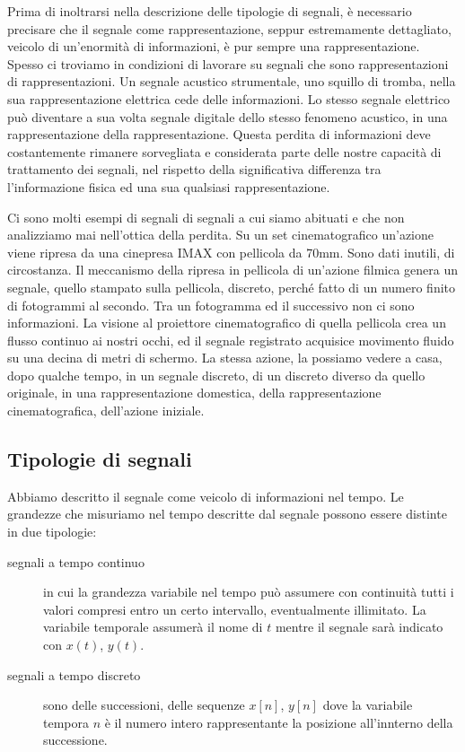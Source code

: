Prima di inoltrarsi nella descrizione delle tipologie di segnali, è necessario
precisare che il segnale come rappresentazione, seppur estremamente dettagliato,
veicolo di un'enormità di informazioni, è pur sempre una rappresentazione. Spesso
ci troviamo in condizioni di lavorare su segnali che sono rappresentazioni di
rappresentazioni. Un segnale acustico strumentale, uno squillo di tromba,
nella sua rappresentazione elettrica cede delle informazioni. Lo stesso segnale
elettrico può diventare a sua volta segnale digitale dello stesso fenomeno acustico,
in una rappresentazione della rappresentazione. Questa perdita di informazioni
deve costantemente rimanere sorvegliata e considerata parte delle nostre capacità
di trattamento dei segnali, nel rispetto della significativa differenza tra
l'informazione fisica ed una sua qualsiasi rappresentazione.

Ci sono molti esempi di segnali di segnali a cui siamo abituati e che non analizziamo
mai nell'ottica della perdita. Su un set cinematografico un'azione viene ripresa
da una cinepresa IMAX con pellicola da 70mm. Sono dati inutili, di circostanza.
Il meccanismo della ripresa in pellicola di un'azione filmica genera un segnale,
quello stampato sulla pellicola, discreto, perché fatto di un numero finito di
fotogrammi al secondo. Tra un fotogramma ed il successivo non ci sono informazioni.
La visione al proiettore cinematografico di quella pellicola crea un flusso
continuo ai nostri occhi, ed il segnale registrato acquisice movimento fluido su
una decina di metri di schermo. La stessa azione, la possiamo vedere a casa,
dopo qualche tempo, in un segnale discreto, di un discreto diverso da quello
originale, in una rappresentazione domestica, della rappresentazione cinematografica,
dell'azione iniziale.

\subsection{Tipologie di segnali}

Abbiamo descritto il segnale come veicolo di informazioni nel tempo. Le grandezze
che misuriamo nel tempo descritte dal segnale possono essere distinte in due
tipologie:

\begin{description}
  \item[segnali a tempo continuo] in cui la grandezza variabile nel tempo può
  assumere con continuità tutti i valori compresi entro un certo intervallo,
  eventualmente illimitato. La variabile temporale assumerà il nome di $t$ mentre
  il segnale sarà indicato con $x(t)$, $y(t)$.
  \item[segnali a tempo discreto] sono delle successioni, delle sequenze $x[n]$,
  $y[n]$ dove la variabile tempora $n$ è il numero intero rappresentante la posizione
  all'innterno della successione.
\end{description}

